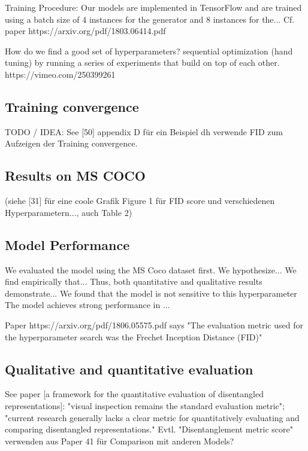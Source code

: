 \documentclass[12pt,a4paper]{article}
\begin{document}
\par Training Procedure: Our models are implemented in TensorFlow \cite{1605.08695} and are trained using a batch size of 4 instances for the generator and 8 instances for the...
Cf. paper https://arxiv.org/pdf/1803.06414.pdf

\par How do we find a good set of hyperparameters? sequential optimization (hand tuning) by running a series of experiments that build on top of each other. https://vimeo.com/250399261

\subsection{Training convergence}
TODO / IDEA: See [50] appendix D für ein Beispiel dh verwende FID zum Aufzeigen der Training convergence.

\subsection{Results on MS COCO}
(siehe [31] für eine coole Grafik Figure 1 für FID score und verschiedenen Hyperparametern..., auch Table 2)

\subsection{Model Performance}
We evaluated the model using the MS Coco dataset first.
We hypothesize...
We find empirically that...
Thus, both quantitative and qualitative results demonstrate...
We found that the model is not sensitive to this hyperparameter
The model achieves strong performance in ...

\par Paper https://arxiv.org/pdf/1806.05575.pdf says "The evaluation metric used for the hyperparameter search was the Frechet Inception Distance (FID)"

\subsection{Qualitative and quantitative evaluation}
See paper [a framework for the quantitative evaluation of disentangled representations]: "visual inspection remains the standard evaluation metric"; "current research generally lacks a clear metric for quantitatively evaluating and comparing disentangled representations."
Evtl. "Disentanglement metric score" verwenden aus Paper 41 für Comparison mit anderen Models?
\end{document}
